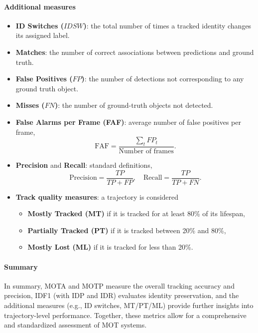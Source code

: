 \paragraph{Additional measures}
\begin{itemize}
    \item \textbf{ID Switches ($IDSW$)}: the total number of times a tracked identity changes its assigned label.
    \item \textbf{Matches}: the number of correct associations between predictions and ground truth.
    \item \textbf{False Positives ($FP$)}: the number of detections not corresponding to any ground truth object.
    \item \textbf{Misses ($FN$)}: the number of ground-truth objects not detected.
    \item \textbf{False Alarms per Frame (FAF)}: average number of false positives per frame,
    \[
    \text{FAF} = \frac{\sum_t FP_t}{\text{Number of frames}}.
    \]
    \item \textbf{Precision} and \textbf{Recall}: standard definitions,
    \[
    \text{Precision} = \frac{TP}{TP+FP}, \quad \text{Recall} = \frac{TP}{TP+FN}.
    \]
    \item \textbf{Track quality measures}: a trajectory is considered
    \begin{itemize}
        \item \textbf{Mostly Tracked (MT)} if it is tracked for at least 80\% of its lifespan,
        \item \textbf{Partially Tracked (PT)} if it is tracked between 20\% and 80\%,
        \item \textbf{Mostly Lost (ML)} if it is tracked for less than 20\%.
    \end{itemize}
\end{itemize}

\paragraph{Summary}
In summary, MOTA and MOTP measure the overall tracking accuracy and precision, IDF1 (with IDP and IDR) evaluates identity preservation, and the additional measures (e.g., ID switches, MT/PT/ML) provide further insights into trajectory-level performance. Together, these metrics allow for a comprehensive and standardized assessment of MOT systems.

\



